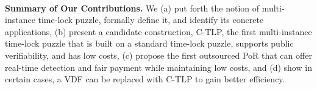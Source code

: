 \

\noindent\textbf{Summary of Our Contributions.} We (a) put forth the notion of multi-instance  time-lock puzzle,  formally define it, and identify its concrete applications,
(b) present a candidate construction, C-TLP,  the first multi-instance time-lock puzzle that is  built on a standard time-lock puzzle,  supports public verifiability, and  has low costs,   (c)  propose   the first  outsourced PoR that can offer  real-time detection and  fair payment while maintaining low costs, and (d) show in certain cases, a VDF can be replaced with C-TLP to gain better efficiency.






